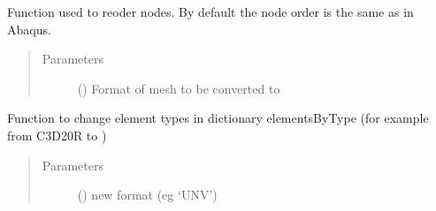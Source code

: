 \documentclass[letterpaper,10pt,english]{sphinxmanual}
\begin{document}
\begin{fulllineitems}
\begin{fulllineitems}
\begin{quote}
\begin{description}
\end{description}\end{quote}

\end{fulllineitems}


\begin{fulllineitems}
\label{\detokenize{pyCofea/api:cofea.PartMesh.reorderNodesInElType}}
Function used to reoder nodes. By default the node
order is the same as in Abaqus.
\begin{quote}\begin{description}
\item[{Parameters}] \leavevmode
{} () \textendash{} Format of mesh to be converted to

\end{description}\end{quote}

\end{fulllineitems}


\begin{fulllineitems}
\label{\detokenize{pyCofea/api:cofea.PartMesh.setElementTypeFormat}}
Function to change element types in dictionary
elementsByType (for example from C3D20R to )
\begin{quote}\begin{description}
\item[{Parameters}] \leavevmode
{} () \textendash{} new format (eg ‘UNV’)

\end{description}\end{quote}

\end{fulllineitems}


\end{fulllineitems}
\end{document}
